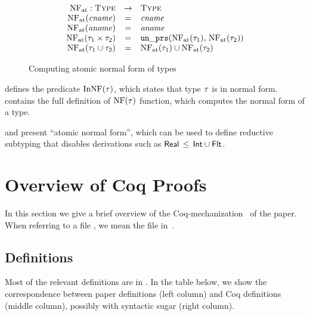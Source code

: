 \begin{figure}
	\[
	\begin{array}{rcl}
	\mathop{\mathrm{NF}_{\mathrm{at}}}: \textsc{Type} &\rightarrow& \textsc{Type} \\
	\mathop{\mathrm{NF}_{\mathrm{at}}}(\mathit{cname}) &=& \mathit{cname} \\
	\mathop{\mathrm{NF}_{\mathrm{at}}}(\mathit{aname}) &=& \mathit{aname} \\
	\mathop{\mathrm{NF}_{\mathrm{at}}}(\tau_1 \times \tau_2) &=& \mathop{\mathtt{un\_prs}}(\mathop{\mathrm{NF}_{\mathrm{at}}}(\tau_1), \, \mathop{\mathrm{NF}_{\mathrm{at}}}(\tau_2))	\\
	\mathop{\mathrm{NF}_{\mathrm{at}}}(\tau_1 \cup \tau_2) &=& \mathop{\mathrm{NF}_{\mathrm{at}}}(\tau_1) \cup \mathop{\mathrm{NF}_{\mathrm{at}}}(\tau_2) \\
	\end{array}
	\]
	\caption{Computing atomic normal form of \BetaJulia types}
	\label{fig:bjnom-calc-nf-full}
\end{figure}

 defines the predicate $\mathop{\mathrm{InNF}}(\tau)$, which states
that type $\tau$ is in normal form.
 contains the full definition of $\mathop{\mathrm{NF}}(\tau)$ 
function, which computes the normal form of a type.

 and  present 
``atomic normal form'', which can be used to define reductive subtyping
that disables derivations such as $\mathsf{Real} \, \leq \, \mathsf{Int} \cup \mathsf{Flt}$.


\section{Overview of Coq Proofs}\label{app:proofs}

In this section we give a brief overview of 
the Coq-mecha\-ni\-za\-tion~\cite{bib:MiniJlCoq} of the paper.
When referring to a file , 
we mean the file  in~\cite{bib:MiniJlCoq}.

\subsection{Definitions}

Most of the relevant definitions are in .
In the table below, 
we show the correspondence between paper definitions (left column)
and Coq definitions (middle column),
possibly with syntactic sugar (right column).

